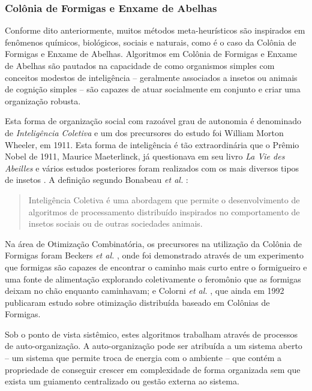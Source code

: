 


\subsubsection{Colônia de Formigas e Enxame de Abelhas}
Conforme dito anteriormente, muitos métodos meta-heurísticos são inspirados em fenômenos químicos, biológicos, sociais e naturais, como é o caso da Colônia de Formigas e Enxame de Abelhas. Algoritmos em Colônia de Formigas e Enxame de Abelhas são pautados na capacidade de como organismos simples com conceitos modestos de inteligência -- geralmente associados a insetos ou animais de cognição simples -- são capazes de atuar socialmente em conjunto e criar uma organização robusta.

Esta forma de organização social com razoável grau de autonomia é denominado de \emph{Inteligência Coletiva} e um dos precursores do estudo foi William Morton Wheeler, em 1911. Esta forma de inteligência é tão extraordinária que o Prêmio Nobel de 1911, Maurice Maeterlinck, já questionava em seu livro \emph{La Vie des Abeilles} e vários estudos posteriores foram realizados com os mais diversos tipos de insetos \cite{Dorigo2010}. A definição segundo Bonabeau \emph{et al.} \cite{bonabeau1999swarm}:

\begin{quote}
Inteligência Coletiva é uma abordagem que permite o desenvolvimento de algoritmos de processamento distribuído inspirados no comportamento de insetos sociais ou de outras sociedades animais.
\end{quote}

Na área de Otimização Combinatória, os precursores na utilização da Colônia de Formigas foram Beckers \emph{et al.} \cite{Beckers1992TrailsAU}, onde foi demonstrado através de um experimento que formigas são capazes de encontrar o caminho mais curto entre o formigueiro e uma fonte de alimentação explorando coletivamente o feromônio que as formigas deixam no chão enquanto caminhavam; e Colorni \emph{et al.} \cite{colorni1992distributed}, que ainda em 1992 publicaram estudo sobre otimização distribuída baseado em Colônias de Formigas.

Sob o ponto de vista sistêmico, estes algoritmos trabalham através de processos de auto-organização. A auto-organização pode ser atribuída a um sistema aberto -- um sistema que permite troca de energia com o ambiente -- que contém a propriedade de conseguir crescer em complexidade de forma organizada sem que exista um guiamento centralizado ou gestão externa ao sistema.

